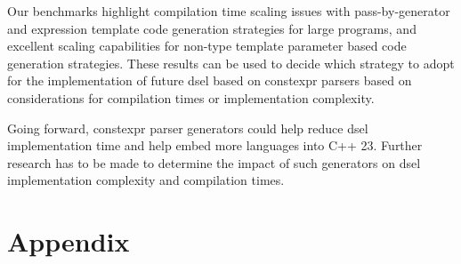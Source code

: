 \documentclass[english,12pt,a4paper]{book}
\providecommand{\cpp}{\textsc{C++}\xspace}
\begin{document}
Our benchmarks highlight compilation time scaling issues with pass-by-generator
and expression template code generation strategies for large programs, and
excellent scaling capabilities for non-type template parameter based code
generation strategies. These results can be used to decide which strategy to
adopt for the implementation of future \acrshort{dsel} based on \gls{constexpr} parsers
based on considerations for compilation times or implementation complexity.

Going forward, \gls{constexpr} parser generators could help reduce
\acrshort{dsel} implementation time and help embed more languages into \cpp23.
Further research has to be made to determine the impact of such generators on
\acrshort{dsel} implementation complexity and compilation times.



\clearpage
\printglossaries

\clearpage
\printbibliography

\chapter{Appendix}

\appendix


\end{document}

